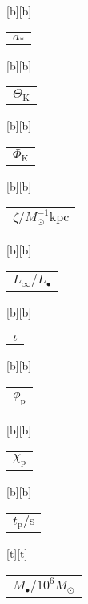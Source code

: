 %    
%
%
\begin{psfrags}%
\psfragscanon%
%
[b][b]{\color[rgb]{0,0,0}\setlength{\tabcolsep}{0pt}\begin{tabular}{c}{$a_\ast$}\end{tabular}}%
[b][b]{\color[rgb]{0,0,0}\setlength{\tabcolsep}{0pt}\begin{tabular}{c}{$\Theta_\mathrm{K}$}\end{tabular}}%
[b][b]{\color[rgb]{0,0,0}\setlength{\tabcolsep}{0pt}\begin{tabular}{c}{$\Phi_\mathrm{K}$}\end{tabular}}%
[b][b]{\color[rgb]{0,0,0}\setlength{\tabcolsep}{0pt}\begin{tabular}{c}{$\zeta/M_\odot^{-1} \mathrm{kpc}$}\end{tabular}}%
[b][b]{\color[rgb]{0,0,0}\setlength{\tabcolsep}{0pt}\begin{tabular}{c}{$L_\infty/L_\bullet$}\end{tabular}}%
[b][b]{\color[rgb]{0,0,0}\setlength{\tabcolsep}{0pt}\begin{tabular}{c}{$\iota$}\end{tabular}}%
[b][b]{\color[rgb]{0,0,0}\setlength{\tabcolsep}{0pt}\begin{tabular}{c}{$\phi_\mathrm{p}$}\end{tabular}}%
[b][b]{\color[rgb]{0,0,0}\setlength{\tabcolsep}{0pt}\begin{tabular}{c}{$\chi_\mathrm{p}$}\end{tabular}}%
[b][b]{\color[rgb]{0,0,0}\setlength{\tabcolsep}{0pt}\begin{tabular}{c}{$t_\mathrm{p}/\mathrm{s}$}\end{tabular}}%
[t][t]{\color[rgb]{0,0,0}\setlength{\tabcolsep}{0pt}\begin{tabular}{c}{$M_\bullet/10^6 M_\odot$}\end{tabular}}%

\end{psfrags}
